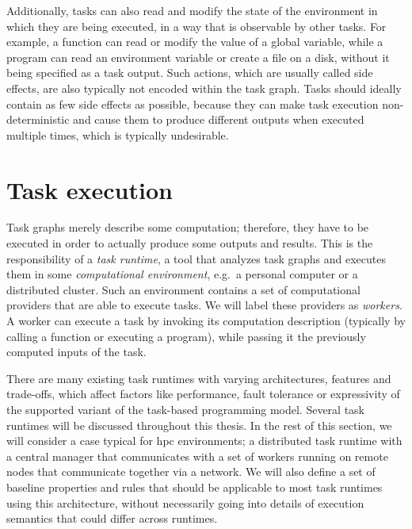 Additionally, tasks can also read and modify the state of the environment in
which they are being executed, in a way that is observable by other tasks. For example, a
function can
read or modify the value of a global variable, while a program can read an environment variable or
create a file on a disk, without it being specified as a task output. Such actions, which are
usually called side effects, are also typically not encoded within the task graph. Tasks
should
ideally contain as few side effects as possible, because they can make task execution
non-deterministic and cause them to produce different outputs when executed multiple times, which is
typically undesirable.

\section{Task execution}
\label{sec:task-graph-execution}
Task graphs merely describe some computation; therefore, they have to be executed in order to
actually produce some outputs and results. This is the responsibility of a \emph{task runtime},
a tool that analyzes task graphs and executes them in some \emph{computational environment}, e.g.\ a personal
computer or a distributed cluster. Such an environment contains a set of computational providers
that are able to execute tasks. We will label these providers as \emph{workers}. A worker
can execute a task by invoking its computation description (typically by
calling a function or
executing a program), while passing it the previously computed inputs of the task.


There are many existing task runtimes with varying architectures, features and trade-offs, which
affect factors like performance, fault tolerance or expressivity of the supported variant of the
task-based programming model. Several task runtimes will be discussed throughout this thesis. In
the rest of this section, we will consider a case typical for \gls{hpc} environments;
a distributed task runtime with a central manager that communicates with a set of workers running
on remote nodes that communicate together via a network. We will also define a set of baseline
properties and rules that should be applicable to most task runtimes using this architecture,
without necessarily going into details of execution semantics that could differ across runtimes.

